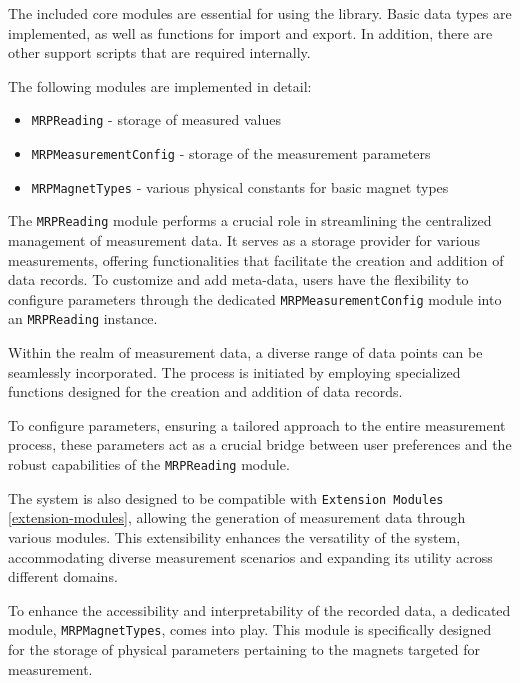 The included core modules are essential for using the library. Basic
data types are implemented, as well as functions for import and export.
In addition, there are other support scripts that are required
internally.

The following modules are implemented in detail:

\begin{itemize}
\tightlist
\item
  \passthrough{\lstinline!MRPReading!} - storage of measured values
\item
  \passthrough{\lstinline!MRPMeasurementConfig!} - storage of the
  measurement parameters
\item
  \passthrough{\lstinline!MRPMagnetTypes!} - various physical constants
  for basic magnet types
\end{itemize}

The \passthrough{\lstinline!MRPReading!} module performs a crucial role
in streamlining the centralized management of measurement data. It
serves as a storage provider for various measurements, offering
functionalities that facilitate the creation and addition of data
records. To customize and add meta-data, users have the flexibility to
configure parameters through the dedicated
\passthrough{\lstinline!MRPMeasurementConfig!} module into an
\passthrough{\lstinline!MRPReading!} instance.

Within the realm of measurement data, a diverse range of data points can
be seamlessly incorporated. The process is initiated by employing
specialized functions designed for the creation and addition of data
records.

To configure parameters, ensuring a tailored approach to the entire
measurement process, these parameters act as a crucial bridge between
user preferences and the robust capabilities of the
\passthrough{\lstinline!MRPReading!} module.

The system is also designed to be compatible with
\passthrough{\lstinline!Extension Modules!} \ref{extension-modules},
allowing the generation of measurement data through various modules.
This extensibility enhances the versatility of the system, accommodating
diverse measurement scenarios and expanding its utility across different
domains.

To enhance the accessibility and interpretability of the recorded data,
a dedicated module, \passthrough{\lstinline!MRPMagnetTypes!}, comes into
play. This module is specifically designed for the storage of physical
parameters pertaining to the magnets targeted for measurement.

